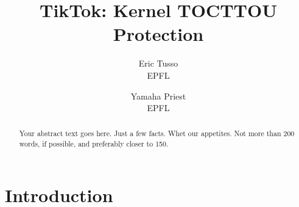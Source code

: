 \usepackage{listings}
\usepackage{parcolumns}
\usepackage{graphicx}
\usepackage{caption}
\usepackage{subcaption}
\usepackage{cleveref}

\newcommand{\pra}[1]{\textcolor{blue}{\textbf{PS:} #1}}
\newcommand{\mat}[1]{\textcolor{red}{\textbf{Mat:} #1}}


\date{}

\title{\Large \bf TikTok: Kernel TOCTTOU Protection}

\author{
{\rm Eric Tusso}\\
EPFL
\and
{\rm Yamaha Priest}\\
EPFL
} %

\maketitle

\begin{abstract}
Your abstract text goes here. Just a few facts. Whet our appetites.
Not more than 200 words, if possible, and preferably closer to 150.
\end{abstract}

\section{Introduction}



